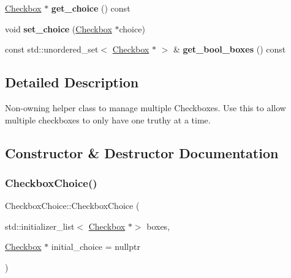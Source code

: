 \begin{DoxyCompactItemize}
\mbox{\label{class_checkbox_choice_a61b7eedbf1aa28060ac22b47039b060a}} 
\mbox{\hyperlink{class_checkbox}{Checkbox}} $\ast$ {\bfseries get\+\_\+choice} () const
\item 
\mbox{\label{class_checkbox_choice_a02298a96989fb9c74de92e3094a51466}} 
void {\bfseries set\+\_\+choice} (\mbox{\hyperlink{class_checkbox}{Checkbox}} $\ast$choice)
\item 
\mbox{\label{class_checkbox_choice_a76ea2985a33d1b48b637d049f55c2443}} 
const std\+::unordered\+\_\+set$<$ \mbox{\hyperlink{class_checkbox}{Checkbox}} $\ast$ $>$ \& {\bfseries get\+\_\+bool\+\_\+boxes} () const
\end{DoxyCompactItemize}


\subsection{Detailed Description}
Non-\/owning helper class to manage multiple Checkboxes. Use this to allow multiple checkboxes to only have one truthy at a time. 

\subsection{Constructor \& Destructor Documentation}
\mbox{\label{class_checkbox_choice_aef739358c920959f7158498af135d261}} 
\subsubsection{\texorpdfstring{Checkbox\+Choice()}{CheckboxChoice()}\hspace{0.1cm}{\footnotesize\ttfamily [1/4]}}
{\footnotesize\ttfamily Checkbox\+Choice\+::\+Checkbox\+Choice (\begin{DoxyParamCaption}\item[{std\+::initializer\+\_\+list$<$ \mbox{\hyperlink{class_checkbox}{Checkbox}} $\ast$$>$}]{boxes,  }\item[{\mbox{\hyperlink{class_checkbox}{Checkbox}} $\ast$}]{initial\+\_\+choice = {\ttfamily nullptr} }\end{DoxyParamCaption})}

